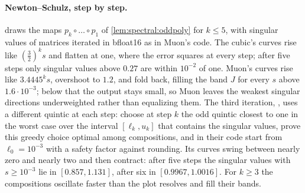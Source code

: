 \begin{refsection}
\paragraph{Newton--Schulz, step by step.}  draws the maps $p_k\circ\dots\circ p_1$ of \cref{lem:spectral:oddpoly} for $k\le5$, with singular values of matrices iterated in bfloat16 as in Muon's code. The cubic's curves rise like $(\frac32)^ks$ and flatten at one, where the error squares at every step; after five steps only singular values above $0.27$ are within $10^{-2}$ of one. Muon's curves rise like $3.4445^ks$, overshoot to $1.2$, and fold back, filling the band $J$ for every $s$ above $1.6\cdot10^{-3}$; below that the output stays small, so Muon leaves the weakest singular directions underweighted rather than equalizing them. The third iteration, , uses a different quintic at each step: \textcite{AmselEtAl2026} choose at step $k$ the odd quintic closest to one in the worst case over the interval $[\ell_k,u_k]$ that contains the singular values, prove this greedy choice optimal among compositions, and in their code start from $\ell_0=10^{-3}$ with a safety factor against rounding. Its curves swing between nearly zero and nearly two and then contract: after five steps the singular values with $s\ge10^{-3}$ lie in $[0.857,1.131]$, after six in $[0.9967,1.0016]$. For $k\ge3$ the compositions oscillate faster than the plot resolves and fill their bands.


\end{refsection}
